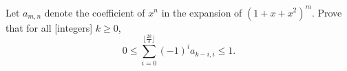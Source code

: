 Let $a_{m,n}$ denote the coefficient of $x^n$ in the expansion of
$(1+x+x^2)^m$.  Prove that for all [integers] $k\geq 0$,
\[0\leq \sum_{i=0}^{\lfloor \frac{2k}{3}\rfloor} (-1)^i a_{k-i,i}\leq
1.\]
